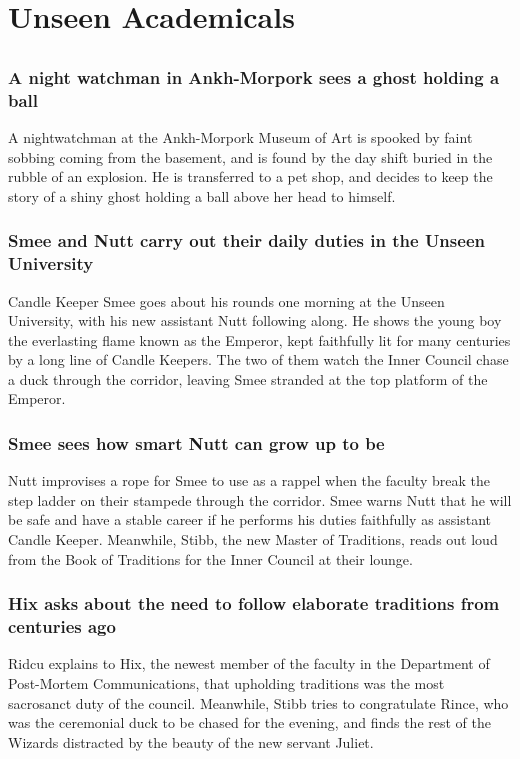 \section{Unseen Academicals}


\subsection{}
\subsubsection{A night watchman in Ankh-Morpork sees a ghost holding a ball}
A nightwatchman at the Ankh-Morpork Museum of Art is spooked by faint sobbing coming from the
basement, and is found by the day shift buried in the rubble of an explosion. He is transferred to
a pet shop, and decides to keep the story of a shiny ghost holding a ball above her head to himself.

\subsubsection{\Gls{Smee} and \Gls{Nutt} carry out their daily duties in the Unseen University}
Candle Keeper \Gls{Smee} goes about his rounds one morning at the Unseen University, with his new
assistant \Gls{Nutt} following along. He shows the young boy the everlasting flame known as the
Emperor, kept faithfully lit for many centuries by a long line of Candle Keepers. The two of them
watch the Inner Council chase a duck through the corridor, leaving \Gls{Smee} stranded at the top
platform of the Emperor.

\subsubsection{\Gls{Smee} sees how smart \Gls{Nutt} can grow up to be}
\Gls{Nutt} improvises a rope for \Gls{Smee} to use as a rappel when the faculty break the step
ladder on their stampede through the corridor. \Gls{Smee} warns \Gls{Nutt} that he will be safe and
have a stable career if he performs his duties faithfully as assistant Candle Keeper. Meanwhile,
\Gls{Stibb}, the new Master of Traditions, reads out loud from the Book of Traditions for the Inner
Council at their lounge.

\subsubsection{\Gls{Hix} asks about the need to follow elaborate traditions from centuries ago}
\Gls{Ridcu} explains to \Gls{Hix}, the newest member of the faculty in the Department of Post-Mortem
Communications, that upholding traditions was the most sacrosanct duty of the council. Meanwhile,
\Gls{Stibb} tries to congratulate \Gls{Rince}, who was the ceremonial duck to be chased for the
evening, and finds the rest of the Wizards distracted by the beauty of the new servant \Gls{Juliet}.

